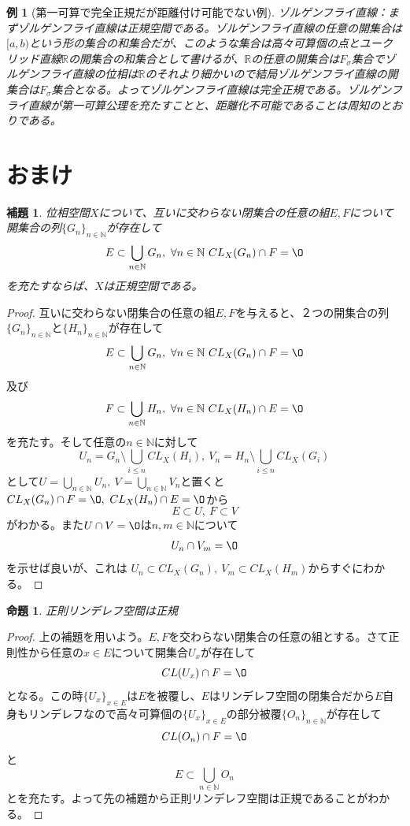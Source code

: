 \documentclass[leqno]{jsarticle}
\newtheorem{prop}[thm]{命題}
\newtheorem{lem}[thm]{補題}
\newtheorem{exam}[thm]{例}
\newcommand{\nn}{\mathbb{N}}
\newcommand{\rr}{\mathbb{R}}
\begin{document}
\begin{exam}[第一可算で完全正規だが距離付け可能でない例]ゾルゲンフライ直線：まずゾルゲンフライ直線は正規空間である。ゾルゲンフライ直線の任意の開集合は$[a,b)$という形の集合の和集合だが、このような集合は高々可算個の点とユークリッド直線$\rr$の開集合の和集合として書けるが、$\rr$の任意の開集合は$F_{\sigma}$集合でゾルゲンフライ直線の位相は$\rr$のそれより細かいので結局ゾルゲンフライ直線の開集合は$F_{\sigma}$集合となる。よってゾルゲンフライ直線は完全正規である。ゾルゲンフライ直線が第一可算公理を充たすことと、距離化不可能であることは周知のとおりである。
\end{exam}


\section*{おまけ}
\begin{lem}
位相空間$X$について、互いに交わらない閉集合の任意の組$E,F$について開集合の列$\{G_n\}_{n\in\nn}$が存在して
\[
E\subset \bigcup_{n\in \nn}G_n,\ \forall n\in \nn \ CL_X(G_n)\cap F=\O
\]を充たすならば、$X$は正規空間である。
\end{lem}
\begin{proof}
互いに交わらない閉集合の任意の組$E,F$を与えると、２つの開集合の列$\{G_n\}_{n\in\nn}$と$\{H_n\}_{n\in\nn}$が存在して
\[
E\subset \bigcup_{n\in \nn}G_n,\ \forall n\in \nn \ CL_X(G_n)\cap F=\O
\]
及び
\[
F\subset \bigcup_{n\in \nn}H_n,\ \forall n\in \nn \ CL_X(H_n)\cap E=\O
\]
を充たす。そして任意の$n\in \nn$に対して
\[
U_n=G_n\setminus \bigcup_{i\le n}CL_X(H_i),\ V_n=H_n\setminus \bigcup_{i\le n}CL_X(G_i)
\]
として$U=\bigcup_{n\in \nn}U_n,\ V=\bigcup_{n\in \nn}V_n$と置くと$CL_X(G_n)\cap F=\O,\ CL_X(H_n)\cap E=\O$から
\[
E\subset U,\ F\subset V
\]
がわかる。また$U\cap V=\O$は$n,m\in \nn$について
\[
U_n\cap V_m=\O
\]
を示せば良いが、これは
$U_n\subset CL_X(G_n),\ V_m\subset CL_X(H_m)$からすぐにわかる。
\end{proof}
\begin{prop}
正則リンデレフ空間は正規
\end{prop}
\begin{proof}
上の補題を用いよう。$E,F$を交わらない閉集合の任意の組とする。さて正則性から任意の$x\in E$について開集合$U_x$が存在して
\[
CL(U_x)\cap F=\O
\]
となる。この時$\{U_x\}_{x\in E}$は$E$を被覆し、$E$はリンデレフ空間の閉集合だから$E$自身もリンデレフなので高々可算個の$\{U_x\}_{x\in E}$の部分被覆$\{O_n\}_{n\in \nn}$が存在して
\[
CL(O_n)\cap F=\O
\]
と
\[
E\subset \bigcup_{n\in \nn}O_n
\]
とを充たす。よって先の補題から正則リンデレフ空間は正規であることがわかる。
\end{proof}
\end{document}
